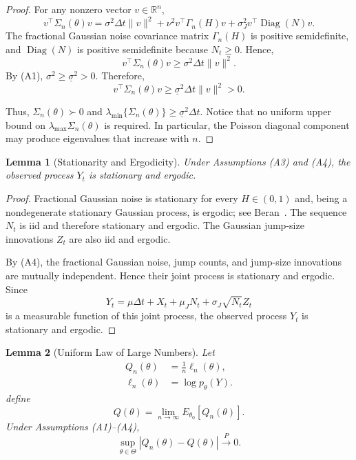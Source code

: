 \documentclass[a4paper,11pt]{amsart}
\newtheorem{lemma}{Lemma}
\theoremstyle{definition}
\theoremstyle{plain}
\theoremstyle{remark}
\newcommand{\1}{\mathbf{1}}
\begin{document}
\begin{proof}
For any nonzero vector $v\in\mathbb{R}^n$,
$$
v^\top\Sigma_n(\theta)v
=\sigma^2\Delta t\|v\|^2
+ \nu^2v^\top\Gamma_n(H)v
+\sigma_J^2
v^\top\operatorname{Diag}(N)v.
$$
The fractional Gaussian noise covariance matrix $\Gamma_n(H)$ is positive semidefinite, and
$\operatorname{Diag}(N)$ is positive semidefinite because
$N_t\geq0$. Hence,
$$
v^\top\Sigma_n(\theta)v
\geq
\sigma^2\Delta t\|v\|^2.
$$
By (A1), $\sigma^2\geq\underline{\sigma}^2>0.$ Therefore, $$ v^\top\Sigma_n(\theta)v
\geq
\underline{\sigma}^2\Delta t\|v\|^2>0.
$$

Thus, $\Sigma_n(\theta)\succ0$
and  $
\lambda_{\min}\{\Sigma_n(\theta)\}
\geq
\underline{\sigma}^2\Delta t.
$
Notice that no uniform upper bound on
$\lambda_{\max}{\Sigma_n(\theta)}$ is required. In particular, the Poisson diagonal component may produce eigenvalues that increase with $n$.
\end{proof}

\begin{lemma}[Stationarity and Ergodicity]
Under Assumptions (A3) and (A4), the observed process
${Y_t}$ is stationary and ergodic.
\end{lemma}

\begin{proof}
Fractional Gaussian noise is stationary for every
$H\in(0,1)$ and, being a nondegenerate stationary Gaussian process, is ergodic; see Beran~\cite{Beran1994}. The sequence
${N_t}$ is iid and therefore stationary and ergodic. The Gaussian jump-size innovations ${Z_t}$ are also iid and ergodic.

By (A4), the fractional Gaussian noise, jump counts, and jump-size innovations are mutually independent. Hence their joint process is stationary and ergodic. Since
$$
Y_t
=
\mu\Delta t
+
X_t
+
\mu_JN_t
+
\sigma_J\sqrt{N_t}Z_t
$$
is a measurable function of this joint process, the observed process ${Y_t}$ is stationary and ergodic.
\end{proof}

\begin{lemma}[Uniform Law of Large Numbers]
Let
\begin{align*}
Q_n(\theta)
&= \frac{1}{n}\ell_n(\theta), \\
\ell_n(\theta)
&= \log p_\theta(Y).
\end{align*}
define
$$
Q(\theta)
=
\lim_{n\to\infty}
E_{\theta_0}[Q_n(\theta)].
$$
Under Assumptions (A1)--(A4),
$$
\sup_{\theta\in\Theta}
|Q_n(\theta)-Q(\theta)|
\xrightarrow{P}0.
$$
\end{lemma}
\end{document}
